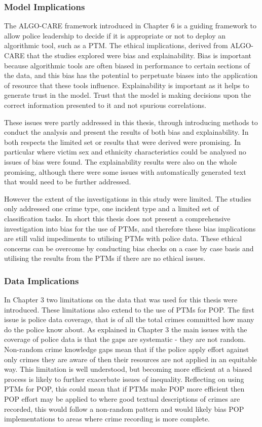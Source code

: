 \subsubsection{Model Implications}  The ALGO-CARE framework introduced in Chapter 6 is a guiding framework to allow police leadership to decide if it is appropriate or not to deploy an algorithmic tool, such as a PTM. The ethical implications, derived from ALGO-CARE that the studies explored were bias and explainability. Bias is important because algorithmic tools are often biased in performance to certain sections of the data, and this bias has the potential to perpetuate biases into the application of resource that these tools influence. Explainability is important as it helps to generate trust in the model. Trust that the model is making decisions upon the correct information presented to it and not spurious correlations.  

These issues were partly addressed in this thesis, through introducing methods to conduct the analysis and present the results of both bias and explainability. In both respects the limited set or results that were derived were promising. In particular where victim sex and ethnicity characteristics could be analysed no issues of bias were found. The explainability results were also on the whole promising, although there were some issues with automatically generated text that would need to be further addressed.

However the extent of the investigations in this study were limited. The studies only addressed one crime type, one incident type and a limited set of classification tasks. In short this thesis does not present a comprehensive investigation into bias for the use of PTMs, and therefore these bias implications are still valid impediments to utilising PTMs with police data. These ethical concerns can  be overcome by conducting bias checks on a case by case basis and utilising the results from the PTMs if there are no ethical issues. 

\subsubsection{Data Implications} In Chapter 3 two limitations on the data that was used for this thesis were introduced. These limitations also extend to the use of PTMs for POP. The first issue is police data coverage, that is of all the total crimes committed how many do the police know about. As explained in Chapter 3 the main issues with the coverage of police data is that the gaps are systematic - they are not random. Non-random crime knowledge gaps mean that if the police apply effort against only crimes they are aware of then their resources are not applied in an equitable way. This limitation is well understood, but becoming more efficient at a biased process is likely to further exacerbate issues of inequality. Reflecting on using PTMs for POP, this could mean that if PTMs make POP more efficient then POP effort may be applied to where good textual descriptions of crimes are recorded, this would follow a non-random pattern and would likely bias POP implementations to areas where crime recording is more complete.

